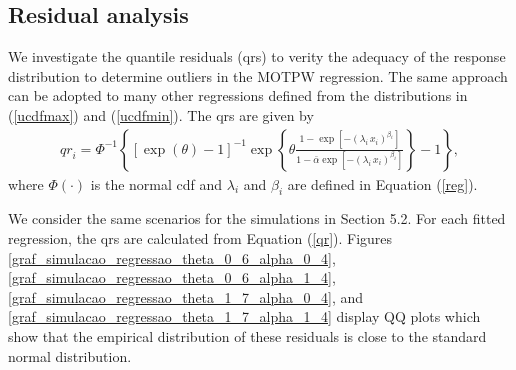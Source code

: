 \documentclass[12pt]{article}
\begin{document}
\subsection{Residual analysis}

We investigate the quantile residuals (qrs) to verity the adequacy of the response
distribution to determine outliers in the MOTPW regression. The same approach
can be adopted to many other regressions defined from the distributions in (\ref{ucdfmax}) and (\ref{ucdfmin}).
The qrs are given by \citep{Dunn1996}
\begin{eqnarray}\label{qr}
{qr}_{i}=\Phi^{-1}\left\{[\exp(\theta)-1]^{-1}{\exp\left\{\theta\frac{1-\exp[-(\lambda_i\,x_i)^{\beta_i}]}{1-\bar{\alpha}\exp[-(\lambda_i\,x_i)^{\beta_i}]}\right\}-1}\right\},
\end{eqnarray}
where $\Phi(\cdot)$ is the normal cdf and $\lambda_i$ and $\beta_i$ are defined in Equation (\ref{reg}).

We consider the same scenarios for the simulations in Section 5.2. For each fitted regression, the qrs are calculated
from Equation (\ref{qr}). Figures \ref{graf_simulacao_regressao_theta_0_6_alpha_0_4},
\ref{graf_simulacao_regressao_theta_0_6_alpha_1_4}, \ref{graf_simulacao_regressao_theta_1_7_alpha_0_4},
and \ref{graf_simulacao_regressao_theta_1_7_alpha_1_4} display QQ plots which show that the empirical distribution
of these residuals is close to the standard normal distribution.
\end{document}

